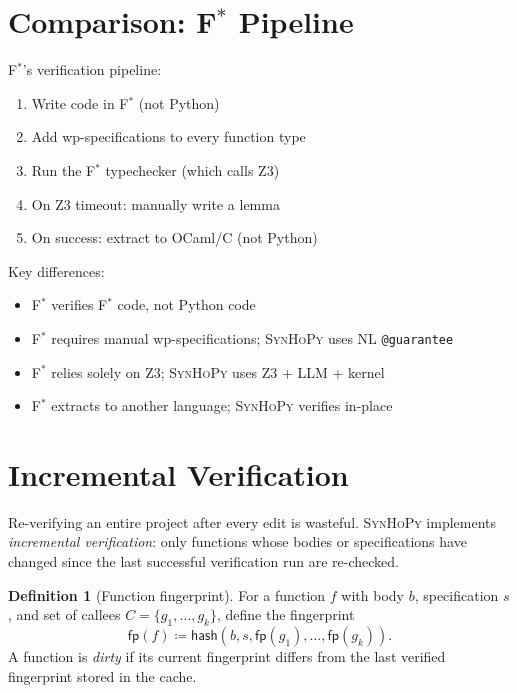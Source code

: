 \documentclass[11pt,a4paper]{report}
\theoremstyle{definition}
\newtheorem{definition}{Definition}[chapter]
\theoremstyle{plain}
\newcommand{\defeq}{\coloneqq}
\newcommand{\fstar}{F$^{*}$}
\newcommand{\synhopy}{\textsc{SynHoPy}}
\begin{document}
\section{Comparison: \fstar{} Pipeline}

\fstar{}'s verification pipeline:
\begin{enumerate}
  \item Write code in \fstar{} (not Python)
  \item Add wp-specifications to every function type
  \item Run the \fstar{} typechecker (which calls Z3)
  \item On Z3 timeout: manually write a lemma
  \item On success: extract to OCaml/C (not Python)
\end{enumerate}

Key differences:
\begin{itemize}
  \item \fstar{} verifies \fstar{} code, not Python code
  \item \fstar{} requires manual wp-specifications; \synhopy{} uses
    NL \lstinline[style=synhopy]{@guarantee}
  \item \fstar{} relies solely on Z3; \synhopy{} uses Z3 + LLM + kernel
  \item \fstar{} extracts to another language; \synhopy{} verifies in-place
\end{itemize}

\section{Incremental Verification}

Re-verifying an entire project after every edit is wasteful.  \synhopy{}
implements \emph{incremental verification}: only functions whose bodies or
specifications have changed since the last successful verification run are
re-checked.

\begin{definition}[Function fingerprint]
For a function $f$ with body $b$, specification $s$, and set of callees
$C = \{g_1, \ldots, g_k\}$, define the fingerprint
\[
  \mathsf{fp}(f) \defeq \mathsf{hash}(b, s, \mathsf{fp}(g_1), \ldots, \mathsf{fp}(g_k)).
\]
A function is \emph{dirty} if its current fingerprint differs from the last
verified fingerprint stored in the cache.
\end{definition}
\end{document}
